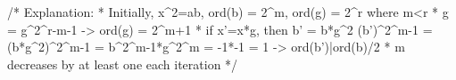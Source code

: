 
/* Explanation:
 * Initially, x^2=ab, ord(b) = 2^m, ord(g) = 2^r where m<r
 * g = g^{2^{r-m-1}} -> ord(g) = 2^{m+1}
 * if x'=x*g, then b' = b*g^2
		(b')^{2^{m-1}} = (b*g^2)^{2^{m-1}}
					   = b^{2^{m-1}}*g^{2^m}
					   = -1*-1
					   = 1
	-> ord(b')|ord(b)/2
 * m decreases by at least one each iteration
 */